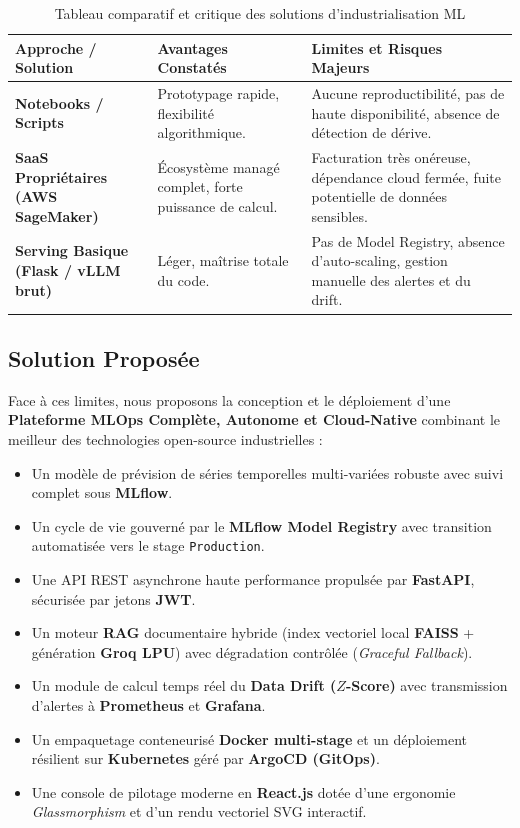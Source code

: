 \documentclass[11pt,a4paper,oneside]{report}
\begin{document}
\begin{table}[H]
\centering
\small
{}
\begin{tabularx}{\textwidth}{@{}p{3.8cm}p{4.2cm}X@{}}
\toprule
\textbf{Approche / Solution} & \textbf{Avantages Constatés} & \textbf{Limites et Risques Majeurs} \\ \midrule
\textbf{Notebooks / Scripts} & Prototypage rapide, flexibilité algorithmique. & Aucune reproductibilité, pas de haute disponibilité, absence de détection de dérive. \\
\textbf{SaaS Propriétaires (AWS SageMaker)} & Écosystème managé complet, forte puissance de calcul. & Facturation très onéreuse, dépendance cloud fermée, fuite potentielle de données sensibles. \\
\textbf{Serving Basique (Flask / vLLM brut)} & Léger, maîtrise totale du code. & Pas de Model Registry, absence d'auto-scaling, gestion manuelle des alertes et du drift. \\ \bottomrule
\end{tabularx}
\caption{Tableau comparatif et critique des solutions d'industrialisation ML}
\label{tab:critique_existant}
\end{table}

\subsection{Solution Proposée}
Face à ces limites, nous proposons la conception et le déploiement d'une \textbf{Plateforme MLOps Complète, Autonome et Cloud-Native} combinant le meilleur des technologies open-source industrielles :
\begin{itemize}[leftmargin=0.8cm, itemsep=3pt, topsep=1pt]
    \item Un modèle de prévision de séries temporelles multi-variées robuste avec suivi complet sous \textbf{MLflow}.
    \item Un cycle de vie gouverné par le \textbf{MLflow Model Registry} avec transition automatisée vers le stage \texttt{Production}.
    \item Une API REST asynchrone haute performance propulsée par \textbf{FastAPI}, sécurisée par jetons \textbf{JWT}.
    \item Un moteur \textbf{RAG} documentaire hybride (index vectoriel local \textbf{FAISS} + génération \textbf{Groq LPU}) avec dégradation contrôlée (\textit{Graceful Fallback}).
    \item Un module de calcul temps réel du \textbf{Data Drift ($Z$-Score)} avec transmission d'alertes à \textbf{Prometheus} et \textbf{Grafana}.
    \item Un empaquetage conteneurisé \textbf{Docker multi-stage} et un déploiement résilient sur \textbf{Kubernetes} géré par \textbf{ArgoCD (GitOps)}.
    \item Une console de pilotage moderne en \textbf{React.js} dotée d'une ergonomie \textit{Glassmorphism} et d'un rendu vectoriel SVG interactif.
\end{itemize}
\end{document}

